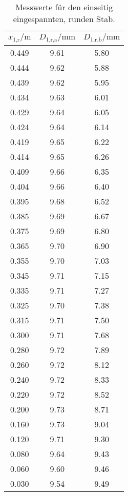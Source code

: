 \begin{table}[h]
  \centering
  \caption{Messwerte für den einseitig eingespannten, runden Stab.}
  \label{tab:Rundein}
  \begin{tabular}{c c c}
    \toprule
    $x_\text{1,r}/\si{\meter}$ & $D_\text{1,r,a}/\si{\milli\meter}$ &
    $D_\text{1,r,b}/\si{\milli\meter}$ \\
    \midrule
    0.449 & 9.61 & 5.80 \\
    0.444 & 9.62 & 5.88 \\
    0.439 & 9.62 & 5.95 \\
    0.434 & 9.63 & 6.01 \\
    0.429 & 9.64 & 6.05 \\
    0.424 & 9.64 & 6.14 \\
    0.419 & 9.65 & 6.22 \\
    0.414 & 9.65 & 6.26 \\
    0.409 & 9.66 & 6.35 \\
    0.404 & 9.66 & 6.40 \\
    0.395 & 9.68 & 6.52 \\
    0.385 & 9.69 & 6.67 \\
    0.375 & 9.69 & 6.80 \\
    0.365 & 9.70 & 6.90 \\
    0.355 & 9.70 & 7.03 \\
    0.345 & 9.71 & 7.15 \\
    0.335 & 9.71 & 7.27 \\
    0.325 & 9.70 & 7.38 \\
    0.315 & 9.71 & 7.50 \\
    0.300 & 9.71 & 7.68 \\
    0.280 & 9.72 & 7.89 \\
    0.260 & 9.72 & 8.12 \\
    0.240 & 9.72 & 8.33 \\
    0.220 & 9.72 & 8.52 \\
    0.200 & 9.73 & 8.71 \\
    0.160 & 9.73 & 9.04 \\
    0.120 & 9.71 & 9.30 \\
    0.080 & 9.64 & 9.43 \\
    0.060 & 9.60 & 9.46 \\
    0.030 & 9.54 & 9.49 \\
    \bottomrule
  \end{tabular}
\end{table}

